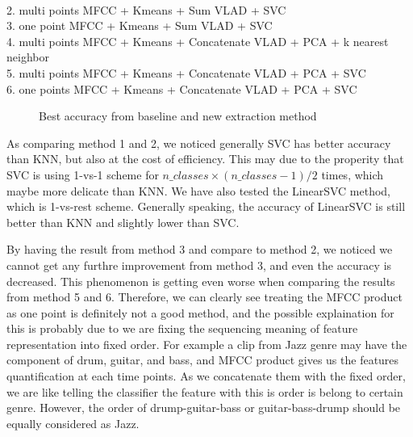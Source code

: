 \documentclass[final]{siamltexmm}
\begin{document}
\\ 2. multi points MFCC + Kmeans + Sum VLAD + SVC
\\ 3. one point MFCC + Kmeans + Sum VLAD + SVC
\\ 4. multi points MFCC + Kmeans + Concatenate VLAD + PCA + k nearest neighbor
\\ 5. multi points MFCC + Kmeans + Concatenate VLAD + PCA + SVC
\\ 6. one points MFCC + Kmeans + Concatenate VLAD + PCA + SVC
\begin{figure}%
    \centering
    \qquad
    \caption{Best accuracy from baseline and new extraction method}%
    \label{fig:example}%
\end{figure}

As comparing method 1 and 2, we noticed generally SVC has better accuracy than KNN, but also at the cost of efficiency. This may due to the properity that SVC is using 1-vs-1 scheme for $n\_classes\times(n\_classes-1)/2$ times, which maybe more delicate than KNN. We have also tested the LinearSVC method, which is 1-vs-rest scheme. Generally speaking, the accuracy of LinearSVC is still better than KNN and slightly lower than SVC.

By having the result from method 3 and compare to method 2, we noticed we cannot get any furthre improvement from method 3, and even the accuracy is decreased. This phenomenon is getting even worse when comparing the results from method 5 and 6. Therefore, we can clearly see treating the MFCC product as one point is definitely not a good method, and the possible explaination for this is probably due to we are fixing the sequencing meaning of feature representation into fixed order. For example a clip from Jazz genre may have the component of drum, guitar, and bass, and MFCC product gives us the features quantification at each time points. As we concatenate them with the fixed order, we are like telling the classifier the feature with this is order is belong to certain genre. However, the order of drump-guitar-bass or guitar-bass-drump should be equally considered as Jazz.
\end{document}
